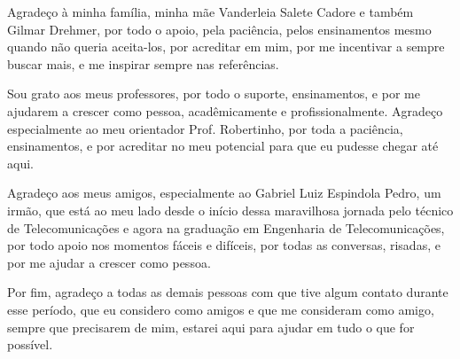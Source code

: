 \begin{agradecimentos}
    
    Agradeço à minha família, minha mãe Vanderleia Salete Cadore e também Gilmar Drehmer, por todo o apoio, pela paciência, pelos ensinamentos mesmo quando não queria aceita-los, por acreditar em mim, por me incentivar a sempre buscar mais, e me inspirar sempre nas referências. 

    Sou grato aos meus professores, por todo o suporte, ensinamentos, e por me ajudarem a crescer como pessoa, acadêmicamente e profissionalmente. Agradeço especialmente ao meu orientador Prof. Robertinho, por toda a paciência, ensinamentos, e por acreditar no meu potencial para que eu pudesse chegar até aqui. 

    Agradeço aos meus amigos, especialmente ao Gabriel Luiz Espindola Pedro, um irmão, que está ao meu lado desde o início dessa maravilhosa jornada pelo técnico de Telecomunicações e agora na graduação em Engenharia de Telecomunicações, por todo apoio nos momentos fáceis e difíceis, por todas as conversas, risadas, e por me ajudar a crescer como pessoa.

    Por fim, agradeço a todas as demais pessoas com que tive algum contato durante esse período, que eu considero como amigos e que me consideram como amigo, sempre que precisarem de mim, estarei aqui para ajudar em tudo o que for possível.

\end{agradecimentos}
